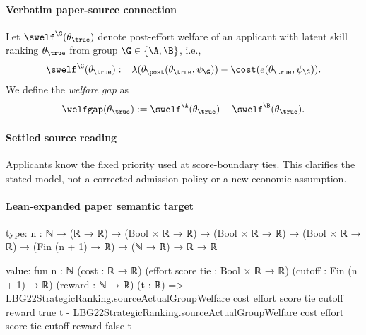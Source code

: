 \documentclass[10pt]{article}
\begin{document}
\paragraph{Verbatim paper-source connection}
\begin{ReviewVerbatim}
\begin{definition}
	Let $\swelf^\G(\theta_\true)$ denote post-effort welfare of an applicant with latent skill ranking $\theta_\true$ from group $\G \in \{\A, \B\}$, i.e.,
	\begin{equation}
	\swelf^\G(\theta_\true):= \lambda(\theta_\post(\theta_\true, \psi_\G)) - \cost(e(\theta_\true, \psi_\G)).
	\end{equation}
	We define the \emph{%
		welfare gap} as %
	\begin{equation*}
		\welfgap(\theta_\true):= \swelf^\A(\theta_\true) - \swelf^\B(\theta_\true).
	\end{equation*}
\end{definition}
\end{ReviewVerbatim}

\paragraph{Settled source reading}
\begin{sloppypar}
Applicants know the fixed priority used at score-\allowbreak{}boundary ties.\allowbreak{} This clarifies the stated model, not a corrected admission policy or a new economic assumption.\allowbreak{}
\end{sloppypar}

\paragraph{Lean-expanded paper semantic target}
\begin{ReviewVerbatim}
type:
{n : ℕ} → (ℝ → ℝ) → (Bool × ℝ → ℝ) → (Bool × ℝ → ℝ) → (Bool × ℝ → ℝ) → (Fin (n + 1) → ℝ) → (ℕ → ℝ) → ℝ → ℝ

value:
fun {n : ℕ} (cost : ℝ → ℝ) (effort score tie : Bool × ℝ → ℝ) (cutoff : Fin (n + 1) → ℝ) (reward : ℕ → ℝ) (t : ℝ) =>
  LBG22StrategicRanking.sourceActualGroupWelfare cost effort score tie cutoff reward true t -
    LBG22StrategicRanking.sourceActualGroupWelfare cost effort score tie cutoff reward false t
\end{ReviewVerbatim}
\end{document}
